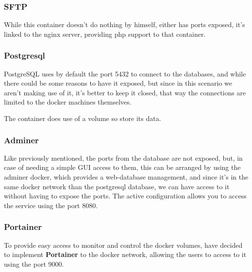     \subsubsection[PHP]{SFTP}
    \begin{flushleft}
        While this container doesn't do nothing by himself, either has ports exposed, it's linked to the nginx server, providing php support
        to that container.
    \end{flushleft}

    \subsubsection[Postgresql]{Postgresql}
    \begin{flushleft}
        PostgreSQL uses by default the port 5432 to connect to the databases, and while there could be some reasons to
        have it exposed, but since in this scenario we aren't making use of it, it's better to keep it closed, that way
        the connections are limited to the docker machines themselves.
    \end{flushleft}
    \begin{flushleft}
        The container does use of a volume so store its data.
    \end{flushleft}
    \newpage
    \subsubsection[Adminer]{Adminer}
    \begin{flushleft}
        Like previously mentioned, the ports from the database are not exposed, but, in case of needing a simple GUI
        access to them, this can be arranged by using the adminer docker, which provides a web-database management,
        and since it's in the same docker network than the postgresql database, we can have access to it without having
        to expose the ports.
        The active configuration allows you to access the service using the port 8080.
    \end{flushleft}

    \subsubsection[Portainer]{Portainer}
    \begin{flushleft}
        To provide easy access to monitor and control the docker volumes, have decided to implement \textbf{Portainer}
        to the docker network, allowing the users to access to it using the port 9000.
    \end{flushleft}


